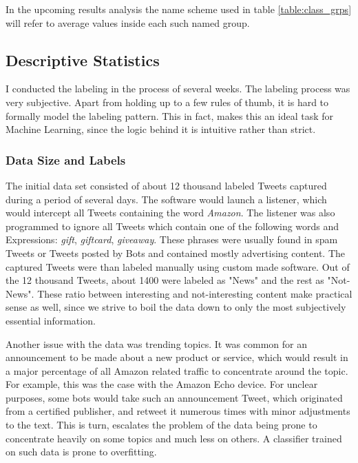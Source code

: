 		In the upcoming results analysis the name scheme used in table \ref{table:class_grps} will refer to average values inside each such named group. 
	
	\subsection{Descriptive Statistics}
		I conducted the labeling in the process of several weeks. The labeling process was very subjective. Apart from holding up to a few rules of thumb, it is hard to formally model the labeling pattern. This in fact, makes this an ideal task for Machine Learning, since the logic behind it is intuitive rather than strict.
		
		\subsubsection{Data Size and Labels}
			The initial data set consisted of about 12 thousand labeled Tweets captured during a period of several days. The software would launch a listener, which would intercept all Tweets containing the word \textit{Amazon}. The listener was also programmed to ignore all Tweets which contain one of the following words and Expressions: \textit{gift}, \textit{giftcard}, \textit{giveaway}. These phrases were usually found in spam Tweets or Tweets posted by Bots and contained mostly advertising content. The captured Tweets were than labeled manually using custom made software. Out of the 12 thousand Tweets, about 1400 were labeled as "News" and the rest as "Not-News". These ratio between interesting and not-interesting content make practical sense as well, since we strive to boil the data down to only the most subjectively essential information. 
			
			\par
			
			Another issue with the data was trending topics. It was common for an announcement to be made about a new product or service, which would result in a major percentage of all Amazon related traffic to concentrate around the topic. For example, this was the case with the Amazon Echo device. For unclear purposes, some bots would take such an announcement Tweet, which originated from a certified publisher, and retweet it numerous times with minor adjustments to the text. This is turn, escalates the problem of the data being prone to concentrate heavily on some topics and much less on others. A classifier trained on such data is prone to overfitting.
			
